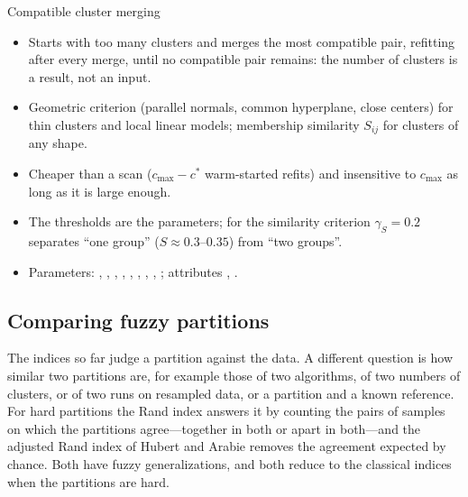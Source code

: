 \begin{summarybox}{Compatible cluster merging}
\begin{itemize}
  \item Starts with too many clusters and merges the most compatible pair, refitting after every merge, until no compatible pair remains: the number of clusters is a result, not an input.
  \item Geometric criterion (parallel normals, common hyperplane, close centers) for thin clusters and local linear models; membership similarity $S_{ij}$ for clusters of any shape.
  \item Cheaper than a scan ($c_{\max}-c^*$ warm-started refits) and insensitive to $c_{\max}$ as long as it is large enough.
  \item The thresholds are the parameters; for the similarity criterion $\gamma_S=0.2$ separates ``one group'' ($S\approx0.3$--$0.35$) from ``two groups''.
  \item Parameters: , , , , , , , , ; attributes , .
\end{itemize}
\end{summarybox}

\subsection{Comparing fuzzy partitions}\label{sec:val:compare}

The indices so far judge a partition against the data. A different question is how similar two partitions are, for example those of two algorithms, of two numbers of clusters, or of two runs on resampled data, or a partition and a known reference. For hard partitions the Rand index answers it by counting the pairs of samples on which the partitions agree---together in both or apart in both---and the adjusted Rand index of Hubert and Arabie \cite{hubert:1985:ari} removes the agreement expected by chance. Both have fuzzy generalizations, and both reduce to the classical indices when the partitions are hard.

